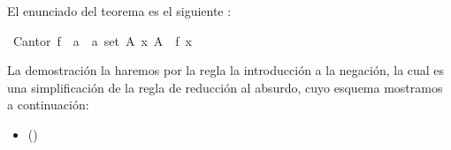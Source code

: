 \begin{isabellebody}
\begin{isamarkuptext}
El enunciado del teorema es el siguiente :%
\end{isamarkuptext}\isamarkuptrue%
\isamarkupfalse%
\ Cantor{\isacharcolon}\ {\isachardoublequoteopen}{\isasymnexists}f\ {\isacharcolon}{\isacharcolon}\ {\isacharprime}a\ {\isasymRightarrow}\ {\isacharprime}a\ set{\isachardot}\ {\isasymforall}A{\isachardot}\ {\isasymexists}x{\isachardot}\ A\ {\isacharequal}\ f\ x{\isachardoublequoteclose}\isanewline
\isanewline
%
\isadelimproof
\isanewline
\ \ %
\endisadelimproof
%
\isatagproof
{}\isamarkupfalse%
%
\endisatagproof
{\isafoldproof}%
%
\isadelimproof
%
\endisadelimproof
%
\begin{isamarkuptext}%
La demostración la haremos por la regla la introducción a la
negación, la cual es una simplificación de la regla de 
reducción al absurdo, cuyo esquema mostramos a continuación:   
 \begin{itemize}
  \item[]  \hfill ()
  \end{itemize}



\end{isamarkuptext}
\end{isabellebody}
